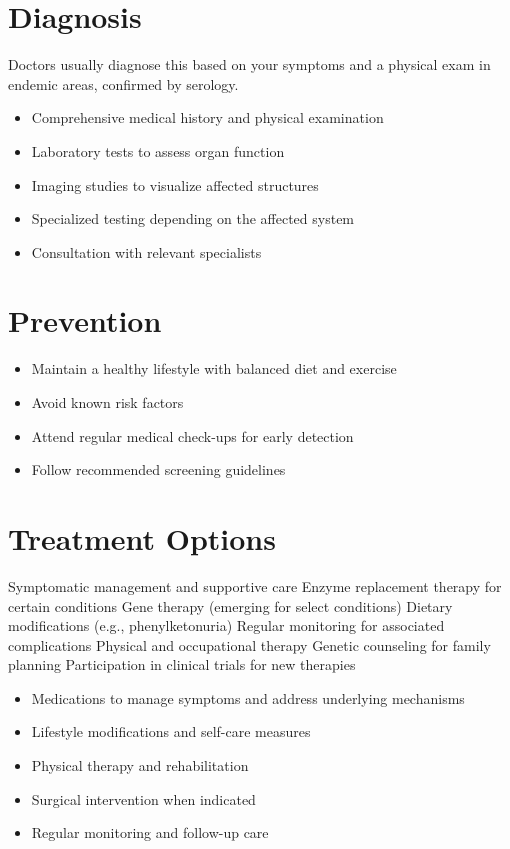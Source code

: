 \section{Diagnosis}
Doctors usually diagnose this based on your symptoms and a physical exam in endemic areas, confirmed by serology.

\begin{itemize}[noitemsep]
  \item Comprehensive medical history and physical examination
  \item Laboratory tests to assess organ function
  \item Imaging studies to visualize affected structures
  \item Specialized testing depending on the affected system
  \item Consultation with relevant specialists
\end{itemize}
\section{Prevention}
\begin{itemize}[noitemsep]
  \item Maintain a healthy lifestyle with balanced diet and exercise
  \item Avoid known risk factors
  \item Attend regular medical check-ups for early detection
  \item Follow recommended screening guidelines
\end{itemize}
\section{Treatment Options}
Symptomatic management and supportive care Enzyme replacement therapy for certain conditions Gene therapy (emerging for select conditions) Dietary modifications (e.g., phenylketonuria) Regular monitoring for associated complications Physical and occupational therapy Genetic counseling for family planning Participation in clinical trials for new therapies

\begin{itemize}[noitemsep]
  \item Medications to manage symptoms and address underlying mechanisms
  \item Lifestyle modifications and self-care measures
  \item Physical therapy and rehabilitation
  \item Surgical intervention when indicated
  \item Regular monitoring and follow-up care
\end{itemize}
